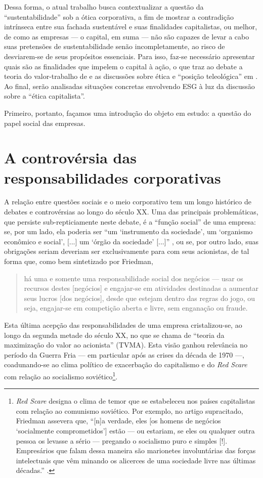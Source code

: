 \documentclass[12pt]{article}
\numberwithin{equation}{section}
\theoremstyle{plain}
\theoremstyle{definition}
\theoremstyle{remark}
\begin{document}
Dessa forma, o atual trabalho busca contextualizar a questão da ``sustentabilidade'' sob a ótica corporativa, a fim de mostrar a contradição intrínseca entre sua fachada sustentável e suas finalidades capitalistas, ou melhor, de como as empresas --- o capital, em suma --- não são capazes de levar a cabo suas pretensões de sustentabilidade senão incompletamente, ao risco de desviarem-se de seus propósitos essenciais. Para isso, faz-se necessário apresentar quais são as finalidades que impelem o capital à ação, o que traz ao debate a teoria do valor-trabalho de \textcite{Marx2017} e as discussões sobre ética e ``posição teleológica'' em \textcite{Lukacs2018}. Ao final, serão analisadas situações concretas envolvendo ESG à luz da discussão sobre a ``ética capitalista''.

Primeiro, portanto, façamos uma introdução do objeto em estudo: a questão do papel social das empresas.

\section{A controvérsia das responsabilidades corporativas}
A relação entre questões sociais e o meio corporativo tem um longo histórico de debates e controvérsias ao longo do século XX. Uma das principais problemáticas, que persiste sub-repticiamente neste debate, é a ``função social'' de uma empresa: se, por um lado, ela poderia ser ``um `instrumento da sociedade', um `organismo econômico e social', [...] um `órgão da sociedade' [...]'' \parencite[p. 110]{PacoCunha2025}, ou se, por outro lado, suas obrigações seriam deveriam ser exclusivamente para com seus acionistas, de tal forma que, como bem sintetizado por Friedman,
\begin{quote}
    há uma e somente uma responsabilidade social dos negócios --- usar os recursos destes [negócios] e engajar-se em atividades destinadas a aumentar seus lucros [dos negócios], desde que estejam dentro das regras do jogo, ou seja, engajar-se em competição aberta e livre, sem enganação ou fraude. \parencite{Friedman1970}
\end{quote}

Esta última acepção das responsabilidades de uma empresa cristalizou-se, ao longo da segunda metade do século XX, no que se chama de ``teoria da maximização do valor ao acionista'' (TVMA). Esta visão ganhou relevância no período da Guerra Fria --- em particular após as crises da década de 1970 \parencite[pp. 112-3]{PacoCunha2025} ---, coadunando-se ao clima político de exacerbação do capitalismo e do \textit{Red Scare} com relação ao socialismo soviético\footnote{\textit{Red Scare} designa o clima de temor que se estabeleceu nos países capitalistas com relação ao comunismo soviético. Por exemplo, no artigo supracitado, Friedman assevera que, ``[n]a verdade, eles [os homens de negócios `socialmente comprometidos'] estão --- ou estariam, se eles ou qualquer outra pessoa os levasse a sério --- pregando o socialismo puro e simples [!]. Empresários que falam dessa maneira são marionetes involuntárias das forças intelectuais que vêm minando os alicerces de uma sociedade livre nas últimas décadas.'' \cite{Friedman1970}.}. 
\end{document}
